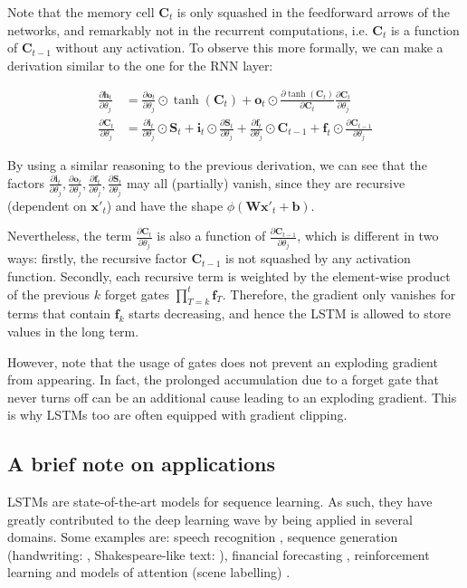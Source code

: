 \documentclass[pdftex,11pt,a4paper]{article}
\theoremstyle{definition}
\theoremstyle{remark}
\newcommand*{\V}[1]{\mathbf{#1}}%
\newcommand{\parder}[2]{\frac{\partial{#1}}{\partial{#2}}}
\begin{document}
\par Note that the memory cell $\V{C}_t$ is only squashed in the feedforward arrows of the networks, and remarkably not in the recurrent computations, i.e. $\V{C}_t$ is a function of $\V{C}_{t-1}$ without any activation. To observe this more formally, we can make a derivation similar to the one for the RNN layer:

\begin{align*}
    \parder{\V{h}_t}{\theta_j} &= \parder{\V{o}_t}{\theta_j}\odot \tanh(\V{C}_t) + \V{o}_t\odot\parder{\tanh(\V{C}_t)}{\V{C}_t}\parder{\V{C}_t}{\theta_j}\\
    \parder{\V{C}_t}{\theta_j} &= \parder{\V{i}_t}{\theta_j}\odot\V{S}_t +  \V{i}_t\odot\parder{\V{S}_t}{\theta_j} + \parder{\V{f}_t}{\theta_j}\odot\V{C}_{t-1} + \V{f}_t\odot\parder{\V{C}_{t-1}}{\theta_j}
\end{align*}

\par By using a similar reasoning to the previous derivation, we can see that the factors $\parder{\V{i}_t}{\theta_j}, \parder{\V{o}_t}{\theta_j}, \parder{\V{f}_t}{\theta_j}, \parder{\V{S}_t}{\theta_j}$ may all (partially) vanish, since they are recursive (dependent on $\V{x}'_t$) and have the shape $\phi(\V{Wx}'_t + \V{b})$. 

\par Nevertheless, the term $\parder{\V{C}_t}{\theta_j}$ is also a function of $\parder{\V{C}_{t-1}}{\theta_j}$, which is different in two ways: firstly, the recursive factor $\V{C}_{t-1}$ is not squashed by any activation function. Secondly, each recursive term is weighted by the element-wise product of the previous $k$ forget gates $\prod_{T=k}^t\V{f}_T$. Therefore, the gradient only vanishes for terms that contain $\V{f}_k$ starts decreasing, and hence the LSTM is allowed to store values in the long term.

\par However, note that the usage of gates does not prevent an exploding gradient from appearing. In fact, the prolonged accumulation due to a forget gate that never turns off can be an additional cause leading to an exploding gradient. This is why LSTMs too are often equipped with gradient clipping.

\subsection{A brief note on applications} \label{sub_apps}
LSTMs are state-of-the-art models for sequence learning. As such, they have greatly contributed to the deep learning wave by being applied in several domains. Some examples are: speech recognition \cite{Graves2013}, sequence generation (handwriting: \cite{Graves2013_2}, Shakespeare-like text: \cite{Karpathy2015}), financial forecasting \cite{Rutkauskas2011}, reinforcement learning \cite{Hausknecht2015} and models of attention (scene labelling) \cite{You2016,Long2014}. 
\end{document}
